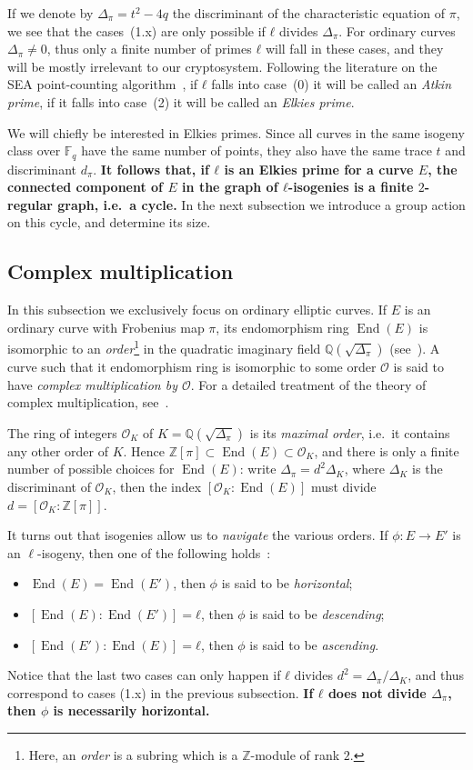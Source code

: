 \documentclass{article}
\newcommand{\F}{\mathbb{F}}
\renewcommand{\O}{\mathcal{O}}
\theoremstyle{definition}
\DeclareMathOperator{\End}{End}
\begin{document}
If we denote by $Δ_π=t^2-4q$ the discriminant of the characteristic
equation of $π$, we see that the cases~(1.x) are only possible if $ℓ$
divides $Δ_π$.  For ordinary curves $Δ_π≠0$, thus only a finite number
of primes $ℓ$ will fall in these cases, and they will be mostly
irrelevant to our cryptosystem. Following the literature on the SEA
point-counting algorithm~\cite{schoof95,todo}, if $ℓ$ falls into
case~(0) it will be called an \emph{Atkin prime}, if it falls into
case~(2) it will be called an \emph{Elkies prime}.

We will chiefly be interested in Elkies primes. Since all curves in
the same isogeny class over $\F_q$ have the same number of points,
they also have the same trace $t$ and discriminant $d_π$.
\textbf{It follows that, if $ℓ$ is an Elkies prime for a curve $E$,
  the connected component of $E$ in the graph of $ℓ$-isogenies is a
  finite $2$-regular graph, i.e.\ a cycle.} In the next subsection we
introduce a group action on this cycle, and determine its size.


\subsection{Complex multiplication}

In this subsection we exclusively focus on ordinary elliptic
curves. If $E$ is an ordinary curve with Frobenius map $π$, its
endomorphism ring $\End(E)$ is isomorphic to an
\emph{order}\footnote{Here, an \emph{order} is a subring which is a
  $ℤ$-module of rank $2$.} in the quadratic imaginary field
$ℚ(\sqrt{Δ_π})$ (see~\cite[III.9]{silverman:elliptic}).  A curve such
that it endomorphism ring is isomorphic to some order $\O$ is said to
have \emph{complex multiplication by $\O$}.  For a detailed treatment
of the theory of complex multiplication,
see~\cite{lang1987elliptic,silverman:advanced}.

The ring of integers $\O_K$ of $K=ℚ(\sqrt{Δ_π})$ is its
\emph{maximal order}, i.e.\ it contains any other order of $K$.  Hence
$ℤ[π]⊂\End(E)⊂\O_K$, and there is only a finite number of possible
choices for $\End(E)$: write $Δ_π=d^2Δ_K$, where $Δ_K$ is the
discriminant of $\O_K$, then the index $[\O_K:\End(E)]$ must divide
$d=[\O_K:ℤ[π]]$.

It turns out that isogenies allow us to \emph{navigate} the various
orders. If $ϕ:E→E'$ is an $\ell$-isogeny, then one of the following
holds~\cite[Prop.~21]{kohel}:
\begin{itemize}
\item $\End(E) = \End(E')$, then $ϕ$ is said to be
  \emph{horizontal};
\item $[\End(E):\End(E')] = ℓ$, then $ϕ$ is said to be
  \emph{descending};
\item $[\End(E'):\End(E)] = ℓ$, then $ϕ$ is said to be
  \emph{ascending}.
\end{itemize}
Notice that the last two cases can only happen if $ℓ$ divides
$d^2=Δ_π/Δ_K$, and thus correspond to cases (1.x) in the previous
subsection.
\textbf{If $ℓ$ does not divide $Δ_π$, then $ϕ$ is necessarily
  horizontal.}
\end{document}

